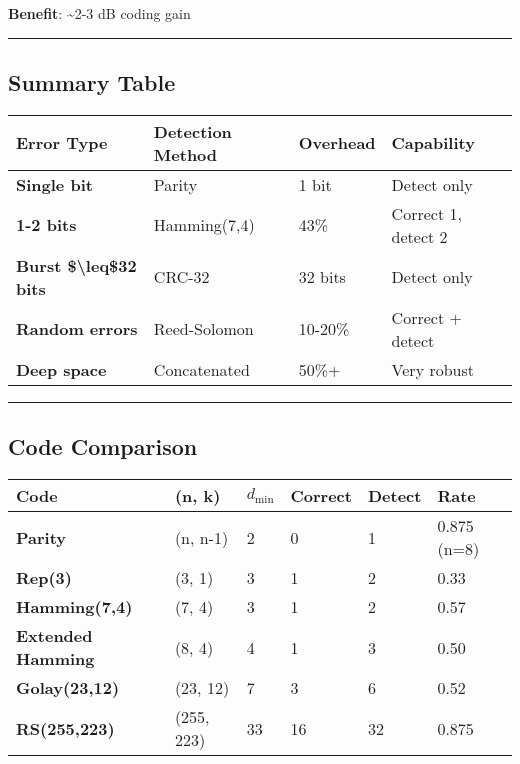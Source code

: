 \textbf{Benefit}: \textasciitilde2-3 dB coding gain

\begin{center}\rule{0.5\linewidth}{0.5pt}\end{center}

\subsection{Summary Table}\label{summary-table}

{\def\LTcaptype{} %
\begin{longtable}[]{@{}llll@{}}
\toprule\noalign{}
Error Type & Detection Method & Overhead & Capability \\
\midrule\noalign{}
\endhead
\bottomrule\noalign{}
\endlastfoot
\textbf{Single bit} & Parity & 1 bit & Detect only \\
\textbf{1-2 bits} & Hamming(7,4) & 43\% & Correct 1, detect 2 \\
\textbf{Burst \$\textbackslash leq\$32 bits} & CRC-32 & 32 bits & Detect
only \\
\textbf{Random errors} & Reed-Solomon & 10-20\% & Correct + detect \\
\textbf{Deep space} & Concatenated & 50\%+ & Very robust \\
\end{longtable}
}

\begin{center}\rule{0.5\linewidth}{0.5pt}\end{center}

\subsection{Code Comparison}\label{code-comparison}

{\def\LTcaptype{} %
\begin{longtable}[]{@{}llllll@{}}
\toprule\noalign{}
Code & (n, k) & \(d_{\min}\) & Correct & Detect & Rate \\
\midrule\noalign{}
\endhead
\bottomrule\noalign{}
\endlastfoot
\textbf{Parity} & (n, n-1) & 2 & 0 & 1 & 0.875 (n=8) \\
\textbf{Rep(3)} & (3, 1) & 3 & 1 & 2 & 0.33 \\
\textbf{Hamming(7,4)} & (7, 4) & 3 & 1 & 2 & 0.57 \\
\textbf{Extended Hamming} & (8, 4) & 4 & 1 & 3 & 0.50 \\
\textbf{Golay(23,12)} & (23, 12) & 7 & 3 & 6 & 0.52 \\
\textbf{RS(255,223)} & (255, 223) & 33 & 16 & 32 & 0.875 \\
\end{longtable}
}

